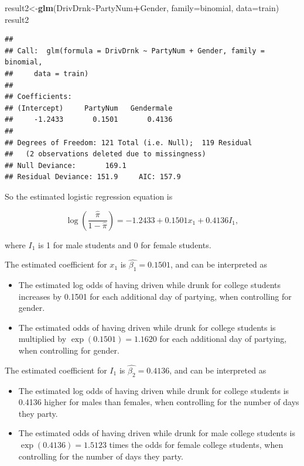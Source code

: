 \documentclass[
]{book}
\newenvironment{Shaded}{\begin{snugshade}}{\end{snugshade}}
\newcommand{\AttributeTok}[1]{\textcolor[rgb]{0.13,0.29,0.53}{#1}}
\newcommand{\FunctionTok}[1]{\textcolor[rgb]{0.13,0.29,0.53}{\textbf{#1}}}
\newcommand{\NormalTok}[1]{#1}
\newcommand{\OtherTok}[1]{\textcolor[rgb]{0.56,0.35,0.01}{#1}}
\newcommand{\SpecialCharTok}[1]{\textcolor[rgb]{0.81,0.36,0.00}{\textbf{#1}}}
\providecommand{\tightlist}{%
  \setlength{\itemsep}{0pt}\setlength{\parskip}{0pt}}
\begin{document}
\begin{Shaded}
\begin{Highlighting}[]
\NormalTok{result2}\OtherTok{\textless{}{-}}\FunctionTok{glm}\NormalTok{(DrivDrnk}\SpecialCharTok{\textasciitilde{}}\NormalTok{PartyNum}\SpecialCharTok{+}\NormalTok{Gender, }\AttributeTok{family=}\NormalTok{binomial, }\AttributeTok{data=}\NormalTok{train)}
\NormalTok{result2}
\end{Highlighting}
\end{Shaded}

\begin{verbatim}
## 
## Call:  glm(formula = DrivDrnk ~ PartyNum + Gender, family = binomial, 
##     data = train)
## 
## Coefficients:
## (Intercept)     PartyNum   Gendermale  
##     -1.2433       0.1501       0.4136  
## 
## Degrees of Freedom: 121 Total (i.e. Null);  119 Residual
##   (2 observations deleted due to missingness)
## Null Deviance:       169.1 
## Residual Deviance: 151.9     AIC: 157.9
\end{verbatim}

So the estimated logistic regression equation is

\[
\log \left( \frac{\hat{\pi}}{1-\hat{\pi}} \right) = -1.2433 + 0.1501x_1 + 0.4136I_1,
\]

where \(I_1\) is 1 for male students and 0 for female students.

The estimated coefficient for \(x_1\) is \(\hat{\beta_1} = 0.1501\), and can be interpreted as

\begin{itemize}
\tightlist
\item
  The estimated log odds of having driven while drunk for college students increases by 0.1501 for each additional day of partying, when controlling for gender.
\item
  The estimated odds of having driven while drunk for college students is multiplied by \(\exp(0.1501) = 1.1620\) for each additional day of partying, when controlling for gender.
\end{itemize}

The estimated coefficient for \(I_1\) is \(\hat{\beta_2} = 0.4136\), and can be interpreted as

\begin{itemize}
\tightlist
\item
  The estimated log odds of having driven while drunk for college students is 0.4136 higher for males than females, when controlling for the number of days they party.
\item
  The estimated odds of having driven while drunk for male college students is \(\exp(0.4136) = 1.5123\) times the odds for female college students, when controlling for the number of days they party.
\end{itemize}
\end{document}
